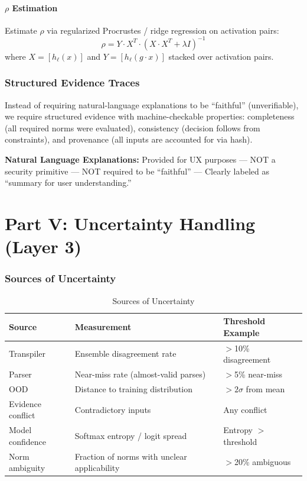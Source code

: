 \documentclass[11pt,letterpaper]{article}
\theoremstyle{definition}
\theoremstyle{remark}
\begin{document}
\subsection{$\rho$ Estimation}

Estimate $\rho$ via regularized Procrustes / ridge regression on activation pairs:
\[
\rho = Y \cdot X^T \cdot (X \cdot X^T + \lambda I)^{-1}
\]
where $X = [h_\ell(x)]$ and $Y = [h_\ell(g \cdot x)]$ stacked over activation pairs.

\section{Structured Evidence Traces}

Instead of requiring natural-language explanations to be ``faithful'' (unverifiable), we require structured evidence with machine-checkable properties: completeness (all required norms were evaluated), consistency (decision follows from constraints), and provenance (all inputs are accounted for via hash).

\textbf{Natural Language Explanations:} Provided for UX purposes --- NOT a security primitive --- NOT required to be ``faithful'' --- Clearly labeled as ``summary for user understanding.''



\part*{Part V: Uncertainty Handling (Layer 3)}

\section{Sources of Uncertainty}

\begin{table}[h]
\centering
\begin{tabular}{@{}lll@{}}
\toprule
\textbf{Source} & \textbf{Measurement} & \textbf{Threshold Example} \\
\midrule
Transpiler & Ensemble disagreement rate & $>$10\% disagreement \\
Parser & Near-miss rate (almost-valid parses) & $>$5\% near-miss \\
OOD & Distance to training distribution & $>2\sigma$ from mean \\
Evidence conflict & Contradictory inputs & Any conflict \\
Model confidence & Softmax entropy / logit spread & Entropy $>$ threshold \\
Norm ambiguity & Fraction of norms with unclear applicability & $>$20\% ambiguous \\
\bottomrule
\end{tabular}
\caption{Sources of Uncertainty}
\end{table}
\end{document}
